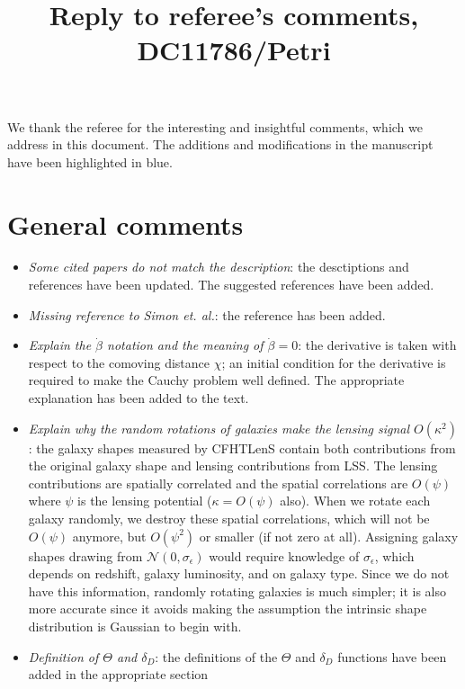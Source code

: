 \documentclass[11pt]{article}
\begin{document}
\title{Reply to referee's comments, DC11786/Petri}
\author{}
\date{}

\maketitle

\noindent
We thank the referee for the interesting and insightful comments, which we address in this document. The additions and modifications in the manuscript have been highlighted in blue. 

\section*{General comments}

\begin{itemize}
\item \textit{Some cited papers do not match the description}: the desctiptions and references have been updated. The suggested references have been added.
\item \textit{Missing reference to Simon et. al.}: the reference has been added.
\item \textit{Explain the $\dot{\beta}$ notation and the meaning of $\dot{\beta}=0$}: the derivative is taken with respect to the comoving distance $\chi$; an initial condition for the derivative is required to make the Cauchy problem well defined. The appropriate explanation has been added to the text.
\item \textit{Explain why the random rotations of galaxies make the lensing signal $O(\kappa^2)$}: the galaxy shapes measured by CFHTLenS contain both contributions from the original galaxy shape and lensing contributions from LSS. The lensing contributions are spatially correlated and the spatial correlations are $O(\psi)$ where $\psi$ is the lensing potential ($\kappa=O(\psi)$ also). When we rotate each galaxy randomly, we destroy these spatial correlations, which will not be $O(\psi)$ anymore, but $O(\psi^2)$ or smaller (if not zero at all). Assigning galaxy shapes drawing from $\mathcal{N}(0,\sigma_\epsilon)$ would require knowledge of $\sigma_\epsilon$, which depends on redshift, galaxy luminosity, and on galaxy type. Since we do not have this information, randomly rotating galaxies is much simpler; it is also more accurate since it avoids making the assumption the intrinsic shape distribution is Gaussian to begin with.  
\item \textit{Definition of $\Theta$ and $\delta_D$}: the definitions of the $\Theta$ and $\delta_D$ functions have been added in the appropriate section

\end{itemize}
\end{document}
